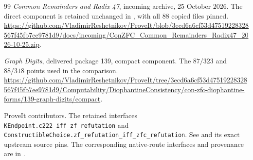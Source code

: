 \documentclass[11pt,letterpaper]{article}
\theoremstyle{definition}
\theoremstyle{remark}
\begin{document}
\begin{thebibliography}{99}
\emph{Common Remainders and Radix 47}, incoming archive, 25 October 2026.
The direct component is retained unchanged in
, with all $88$ copied files pinned.
\url{https://github.com/VladimirReshetnikov/ProveIt/blob/3ecd6a6cf53d47519228328567f45fb7ee9781d9/docs/incoming/ConZFC_Common_Remainders_Radix47_2026-10-25.zip}.

\emph{Graph Digits}, delivered package 139, compact component.
The $87/323$ and $88/318$ points used in the comparison.
\url{https://github.com/VladimirReshetnikov/ProveIt/tree/3ecd6a6cf53d47519228328567f45fb7ee9781d9/Computability/DiophantineConsistency/con-zfc-diophantine-forms/139-graph-digits/compact}.

ProveIt contributors. The retained interfaces
\texttt{KEndpoint.c222\_iff\_zf\_refutation} and
\texttt{ConstructibleChoice.zf\_refutation\_iff\_zfc\_refutation}.
See 
and its exact upstream source pins.  The corresponding native-route
interfaces and provenance are in .
\end{thebibliography}
\end{document}
